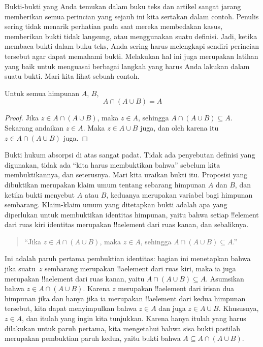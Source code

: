 \documentclass[../../../include/open-logic-section]{subfiles}
\begin{document}

Bukti-bukti yang Anda temukan dalam buku teks dan artikel sangat
jarang memberikan semua perincian yang sejauh ini kita sertakan dalam
contoh. Penulis sering tidak menarik perhatian pada saat mereka
membedakan kasus, memberikan bukti tidak langsung, atau menggunakan
suatu definisi. Jadi, ketika membaca bukti dalam buku teks, Anda sering
harus melengkapi sendiri perincian tersebut agar dapat memahami bukti.
Melakukan hal ini juga merupakan latihan yang baik untuk menguasai
berbagai langkah yang harus Anda lakukan dalam suatu bukti. Mari kita
lihat sebuah contoh.

\begin{prop}[Absorpsi]
Untuk semua himpunan $A$, $B$,
\[
A \cap (A \cup B) = A
\]
\end{prop}

\begin{proof}
Jika $z \in A \cap (A \cup B)$, maka $z \in A$, sehingga $A \cap (A
\cup B) \subseteq A$. Sekarang andaikan $z \in A$. Maka $z \in A \cup
B$ juga, dan oleh karena itu $z \in A \cap (A \cup B)$ juga.
\end{proof}

Bukti hukum absorpsi di atas sangat padat. Tidak ada penyebutan
definisi yang digunakan, tidak ada ``kita harus membuktikan bahwa''
sebelum kita membuktikannya, dan seterusnya. Mari kita uraikan bukti
itu. Proposisi yang dibuktikan merupakan klaim umum tentang sebarang
himpunan $A$ dan $B$, dan ketika bukti menyebut $A$ atau $B$, keduanya
merupakan variabel bagi himpunan sembarang. Klaim-klaim umum yang
ditetapkan bukti adalah apa yang diperlukan untuk membuktikan identitas
himpunan, yaitu bahwa setiap !!{element} dari ruas kiri identitas
merupakan !!a{element} dari ruas kanan, dan sebaliknya.

\begin{quote}
``Jika $z \in A \cap (A \cup B)$, maka $z \in A$, sehingga $A \cap (A
  \cup B) \subseteq A$.''
\end{quote}

Ini adalah paruh pertama pembuktian identitas: bagian ini menetapkan
bahwa jika suatu~$z$ sembarang merupakan !!a{element} dari ruas kiri,
maka ia juga merupakan !!a{element} dari ruas kanan, yaitu $A \cap (A
\cup B) \subseteq A$. Asumsikan bahwa $z \in A \cap (A \cup B)$.
Karena $z$ merupakan !!a{element} dari irisan dua himpunan jika dan
hanya jika ia merupakan !!a{element} dari kedua himpunan tersebut,
kita dapat menyimpulkan bahwa $z \in A$ dan juga $z \in A \cup B$.
Khususnya, $z \in A$, dan itulah yang ingin kita tunjukkan. Karena hanya
itulah yang harus dilakukan untuk paruh pertama, kita mengetahui bahwa
sisa bukti pastilah merupakan pembuktian paruh kedua, yaitu bukti bahwa
$A \subseteq A \cap (A \cup B)$.
\end{document}
